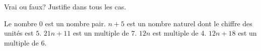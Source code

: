 %
%
Vrai ou faux? Justifie dans tous les cas.
    \begin{tasks}
        \task Le nombre 0 est un nombre pair.
        \task $n + 5$ est un nombre naturel dont le chiffre des unités est $5$.
        \task $21n + 11$ est un multiple de $7$.
        \task $12n$ est multiple de 4.
        \task $12n + 18$ est un multiple de $6$.
    \end{tasks}
